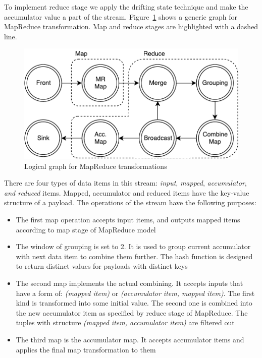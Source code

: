 To implement reduce stage we apply the drifting state technique and make the accumulator value a part of the stream. Figure~\ref{mapreduce-graph-figure} shows a generic graph for MapReduce transformation. Map and reduce stages are highlighted with a dashed line. 

\begin{figure}[htb]
  \centering
  \includegraphics[scale=0.7]{pics/mapreduce}
  \caption{Logical graph for MapReduce transformations}
  \label {mapreduce-graph-figure}
\end{figure}

There are four types of data items in this stream: {\it input}, {\it mapped}, {\it accumulator}, {\it and reduced} items. Mapped, accumulator and reduced items have the key-value structure of a payload. The operations of the stream have the following purposes:

\begin{itemize}
  \item The first map operation accepts input items, and outputs mapped items according to map stage of MapReduce model
  \item The window of grouping is set to 2. It is used to group current accumulator with next data item to combine them further. The hash function is designed to return distinct values for payloads with distinct keys
  \item The second map implements the actual combining. It accepts inputs that have a form of: \textit{(mapped item)} or \textit{(accumulator item, mapped item)}. The first kind is transformed into some initial value. The second one is combined into the new accumulator item as specified by reduce stage of MapReduce. The tuples with structure \textit{(mapped item, accumulator item)} are filtered out
  \item The third map is the accumulator map. It accepts accumulator items and applies the final map transformation to them
\end{itemize}

